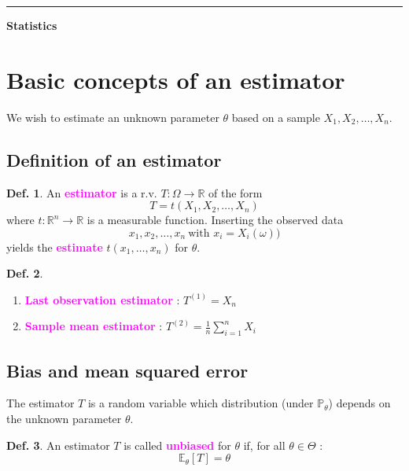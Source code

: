 \documentclass[8pt,a4paper,landscape]{article}
\theoremstyle{definition}
\newtheorem{definition}{Def.}[section]
\theoremstyle{example}
\theoremstyle{intuition}
\theoremstyle{definition}
\newcommand{\mydef}[1]{\textcolor{magenta}{\textbf{#1}}}
\newcommand{\expect}[1]{\mathbb{E}_{\theta}\left[ #1 \right]}
\begin{document}
\begin{multicols}{3}
\bigskip
\noindent\rule{\linewidth}{1.5pt} %
\begin{center}
	\Large\bfseries Statistics 
\end{center}

\setcounter{section}{0}


	\section{Basic concepts of an estimator}
		We wish to estimate an unknown parameter $\theta$ based on a sample $X_1, X_2, \ldots, X_n$.

		
		\subsection{Definition of an estimator}
			\begin{definition}
				An \mydef{estimator} is a r.v. $T : \Omega \to \mathbb{R}$ of the form 
				$$
					T = t(X_1, X_2, \ldots, X_n)
				$$
				where $t : \mathbb{R}^n \to \mathbb{R}$ is a measurable function. Inserting the observed data 
				$$
					x_1, x_2, \ldots, x_n \ \text{with }x_i = X_i(\omega)\text{)}
				$$
				yields the \mydef{estimate} $t(x_1, \ldots, x_n)$ for $\theta$.
			\end{definition}

			\begin{definition}
				\begin{enumerate}
					\item \mydef{Last observation estimator} : $T^{(1)} = X_n$
					\item \mydef{Sample mean estimator} : $T^{(2)} = \frac{1}{n} \sum^n_{i = 1} X_i$
				\end{enumerate}
			\end{definition}


		\subsection{Bias and mean squared error}
			The estimator $T$ is a random variable which distribution (under $\mathbb{P}_\theta$) depends on the unknown parameter $\theta$.

			\begin{definition}
				An estimator $T$ is called \mydef{unbiased} for $\theta$ if, for all $\theta \in \Theta$ :
				$$
					\expect{T} = \theta
				$$
			\end{definition}


\end{multicols}
\end{document}
